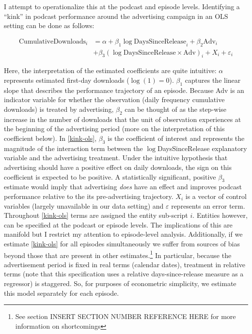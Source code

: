 \documentclass[11pt, letterpaper, twoside]{article}
\begin{document}
I attempt to operationalize this at the podcast and episode levels. Identifying a ``kink'' in podcast performance around the advertising campaign in an OLS setting can be done as follows:

\begin{align}
  \label{kink-ols}
    \text{CumulativeDownloads}_i &= \alpha + \beta_1\log{\text{DaysSinceRelease}}_i + \beta_2\text{Adv}_i\\ \nonumber
      & +\beta_3(\log{\text{DaysSinceRelease}} \times \text{Adv})_i + X_i + \varepsilon_i
\end{align}

Here, the interpretation of the estimated coefficients are quite intuitive: $\alpha$ represents estimated first-day downloads ($\log(1)=0$). $\beta_1$ captures the linear slope that describes the performance trajectory of an episode. Because Adv is an indicator variable for whether the observation (daily frequency cumulative downloads) is treated by advertising, $\beta_2$ can be thought of as the step-wise increase in the number of downloads that the unit of observation experiences at the beginning of the advertising period (more on the interpretation of this coefficient below). In \eqref{kink-ols}, $\beta_3$ is the coefficient of interest and represents the magnitude of the interaction term between the $\log$DaysSinceRelease explanatory variable and the advertising treatment. Under the intuitive hypothesis that advertising should have a positive effect on daily downloads, the sign on this coefficient is expected to be positive. A statistically significant, positive $\beta_3$ estimate would imply that advertising \textit{does} have an effect and improves podcast performance relative to the its pre-advertising trajectory. $X_i$ is a vector of control variables (largely unavailable in our data setting) and $\varepsilon$ represents an error term.\\

Throughout \eqref{kink-ols} terms are assigned the entity sub-script $i$. Entities however, can be specified at the podcast or episode levels. The implications of this are manifold but I restrict my attention to episode-level analysis. Additionally, if we estimate \eqref{kink-ols} for all episodes simultaneously we suffer from sources of bias beyond those that are present in other estimates.\footnote{See section INSERT SECTION NUMBER REFERENCE HERE for more information on shortcomings} In particular, because the advertisement period is fixed in real terms (calendar dates), treatment in relative terms (note that this specification uses a relative days-since-release measure as a regressor) is staggered. So, for purposes of econometric simplicity, we estimate this model separately for each episode.\\
\end{document}
